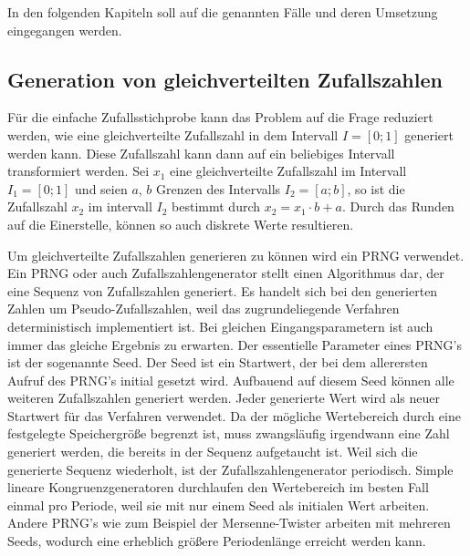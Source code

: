 In den folgenden Kapiteln soll auf die genannten Fälle und deren Umsetzung eingegangen werden.

\subsection{Generation von gleichverteilten Zufallszahlen}

Für die einfache Zufallsstichprobe kann das Problem auf die Frage reduziert werden, wie eine gleichverteilte Zufallszahl in dem Intervall $I=[0;1]$ generiert werden kann. Diese Zufallszahl kann dann auf ein beliebiges Intervall transformiert werden. Sei $x_1$ eine gleichverteilte Zufallszahl im Intervall $I_1=[0;1]$ und seien $a$, $b$ Grenzen des Intervalls $I_2=[a;b]$, so ist die Zufallszahl $x_2$ im intervall $I_2$ bestimmt durch $x_2=x_1 \cdot b+a$. Durch das Runden auf die Einerstelle, können so auch diskrete Werte resultieren.

Um gleichverteilte Zufallszahlen generieren zu können wird ein \ac{PRNG} verwendet. Ein \ac{PRNG} oder auch Zufallszahlengenerator stellt einen Algorithmus dar, der eine Sequenz von Zufallszahlen generiert. Es handelt sich bei den generierten Zahlen um Pseudo-Zufallszahlen, weil das zugrundeliegende Verfahren deterministisch implementiert ist. Bei gleichen Eingangsparametern ist auch immer das gleiche Ergebnis zu erwarten. 
Der essentielle Parameter eines \ac{PRNG}'s ist der sogenannte Seed. Der Seed ist ein Startwert, der bei dem allerersten Aufruf des \ac{PRNG}'s initial gesetzt wird. Aufbauend auf diesem Seed können alle weiteren Zufallszahlen generiert werden. Jeder generierte Wert wird als neuer Startwert für das Verfahren verwendet. Da der mögliche Wertebereich durch eine festgelegte Speichergröße begrenzt ist, muss zwangsläufig irgendwann eine Zahl generiert werden, die bereits in der Sequenz aufgetaucht ist. Weil sich die generierte Sequenz wiederholt, ist der Zufallszahlengenerator periodisch. Simple lineare Kongruenzgeneratoren durchlaufen den Wertebereich im besten Fall einmal pro Periode, weil sie mit nur einem Seed als initialen Wert arbeiten. Andere \ac{PRNG}'s wie zum Beispiel der Mersenne-Twister arbeiten mit mehreren Seeds, wodurch eine erheblich größere Periodenlänge erreicht werden kann.

